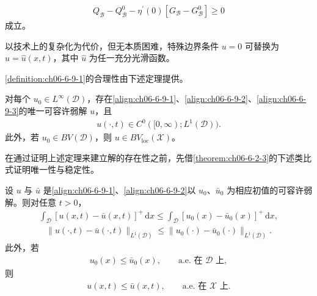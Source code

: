 \documentclass[../../main.tex]{subfiles}
\begin{document}
\begin{align}
Q_{\mathscr{B}}-Q_{\mathscr{B}}^{0}-\eta^{\prime}(0)[G_{\mathscr{B}}-G_{\mathscr{B}}^{0}]\geqslant 0
\label{align:ch06-6-9-5}
\end{align}
成立。

以技术上的复杂化为代价，但无本质困难，特殊边界条件 $u=0$ 可替换为 $u=\hat{u}(x,t)$，其中 $\hat{u}$ 为任一充分光滑函数。

\cref{definition:ch06-6-9-1}的合理性由下述定理提供。

\begin{theorem}\label{theorem:ch06-6-9-2}
对每个 $u_{0}\in L^{\infty}(\mathscr{D})$，存在\eqref{align:ch06-6-9-1}、\eqref{align:ch06-6-9-2}、\eqref{align:ch06-6-9-3}的唯一可容许弱解 $u$，且
\begin{align}
u(\cdot,t)\in C^{0}([0,\infty);L^{1}(\mathscr{D})).
\label{align:ch06-6-9-6}
\end{align}
此外，若 $u_{0}\in BV(\mathscr{D})$，则 $u\in BV_{\mathrm{loc}}(\mathscr{X})$。
\end{theorem}

在通过证明上述定理来建立解的存在性之前，先借\cref{theorem:ch06-6-2-3}的下述类比式证明唯一性与稳定性。

\begin{theorem}\label{theorem:ch06-6-9-3}
设 $u$ 与 $\bar{u}$ 是\eqref{align:ch06-6-9-1}、\eqref{align:ch06-6-9-2}以 $u_{0}$、$\bar{u}_{0}$ 为相应初值的可容许弱解。则对任意 $t>0$，
\begin{align}
\int_{\mathscr{D}}[u(x,t)-\bar{u}(x,t)]^{+}\,\mathrm{d}x\leqslant\int_{\mathscr{D}}[u_{0}(x)-\bar{u}_{0}(x)]^{+}\,\mathrm{d}x,
\label{align:ch06-6-9-7}
\end{align}
\begin{align}
\|u(\cdot,t)-\bar{u}(\cdot,t)\|_{L^{1}(\mathscr{D})}\leqslant\|u_{0}(\cdot)-\bar{u}_{0}(\cdot)\|_{L^{1}(\mathscr{D})}.
\label{align:ch06-6-9-8}
\end{align}
此外，若
\begin{align}
u_{0}(x)\leqslant\bar{u}_{0}(x),\qquad\text{a.e.\ 在 }\mathscr{D}\text{ 上},
\label{align:ch06-6-9-9}
\end{align}
则
\begin{align}
u(x,t)\leqslant\bar{u}(x,t),\qquad\text{a.e.\ 在 }\mathscr{X}\text{ 上}.
\label{align:ch06-6-9-10}
\end{align}
\end{theorem}
\end{document}
